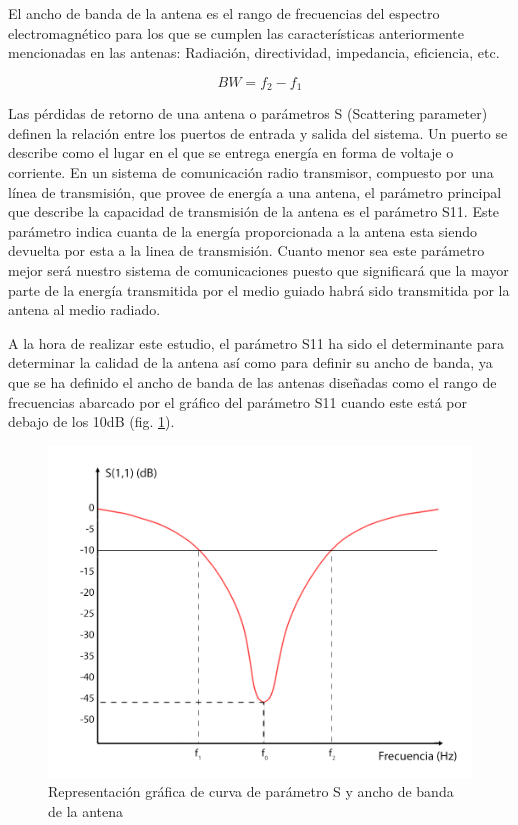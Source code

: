 \par El ancho de banda de la antena es el rango de frecuencias del espectro electromagnético para los que se cumplen las características anteriormente mencionadas en las antenas: Radiación, directividad, impedancia, eficiencia, etc. 

\begin{equation}
	BW=f_{2}-f_{1}
	\label{eq:anchodebanda}
\end{equation}

\par Las pérdidas de retorno de una antena o parámetros S (Scattering parameter) definen la relación entre los puertos de entrada y salida del sistema. Un puerto se describe como el lugar en el que se entrega energía en forma de voltaje o corriente. En un sistema de comunicación radio transmisor, compuesto por una línea de transmisión, que provee de energía a una antena, el parámetro principal que describe la capacidad de transmisión de la antena es el parámetro S11. Este parámetro indica cuanta de la energía proporcionada a la antena esta siendo devuelta por esta a la linea de transmisión. Cuanto menor sea este parámetro mejor será nuestro sistema de comunicaciones puesto que significará que la mayor parte de la energía transmitida por el medio guiado habrá sido transmitida por la antena al medio radiado. 
\\
\par A la hora de realizar este estudio, el parámetro S11 ha sido el determinante para determinar la calidad de la antena así como para definir su ancho de banda, ya que se ha definido el ancho de banda de las antenas diseñadas como el rango de frecuencias abarcado por el gráfico del parámetro S11 cuando este está por debajo de los 10dB (fig. \ref{fig:S}).

\begin{figure}[h]
    \centering
        \includegraphics[width=12cm]{archivos/S}
        \caption{Representación gráfica de curva de parámetro S y ancho de banda de la antena}
        \label{fig:S}
\end{figure}

